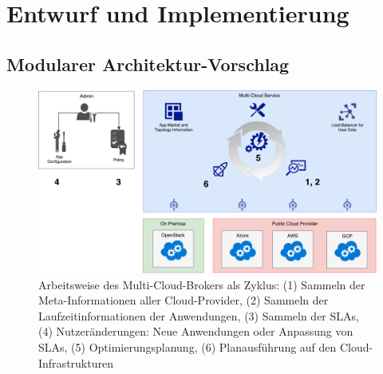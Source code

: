 \chapter{Entwurf und Implementierung}
\label{cha:implementierung}




\section{Modularer Architektur-Vorschlag}

%
%
%

\begin{figure}
	\centering	
	\includegraphics[width=\linewidth]{images/broker-cycle}
	\caption{Arbeitsweise des Multi-Cloud-Brokers als Zyklus: (1) Sammeln der Meta-Informationen aller Cloud-Provider, (2) Sammeln der Laufzeitinformationen der Anwendungen, (3) Sammeln der SLAs, (4) Nutzeränderungen: Neue Anwendungen oder Anpassung von SLAs, (5) Optimierungsplanung, (6) Planausführung auf den Cloud-Infrastrukturen}
	\label{fig:cycle}
\end{figure}



